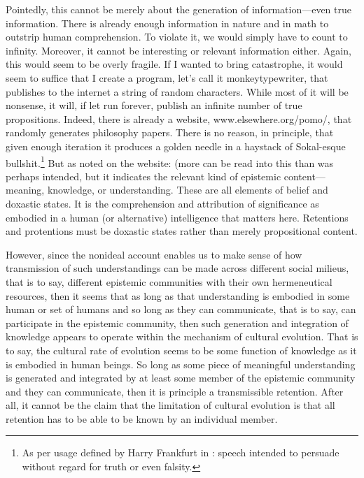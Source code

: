 \documentclass[letterpaper,notitlepage,12pt]{article}
\begin{document}
Pointedly, this cannot be merely about the generation of information---even true
information.
There is already enough information in nature and in math to outstrip human
comprehension.
To violate it, we would simply have to count to infinity.
Moreover, it cannot be interesting or relevant information either.
Again, this would seem to be overly fragile.
If I wanted to bring catastrophe, it would seem to suffice that I create a
program, let's call it monkeytypewriter, that publishes to the internet a string
of random characters.
While most of it will be nonsense, it will, if let run forever, publish an
infinite number of true propositions.
Indeed, there is already a website, www.elsewhere.org/pomo/, that randomly
generates philosophy papers.
There is no reason, in principle, that given enough iteration it produces a
golden needle in a haystack of Sokal-esque bullshit.\footnote{As per usage
defined by Harry Frankfurt in : speech intended to
persuade without regard for truth or even falsity.}
But as noted on the website: 
(more can be read into this than was perhaps intended, but it indicates the
relevant kind of epistemic content---meaning, knowledge, or understanding.
These are all elements of belief and doxastic states.
It is the comprehension and attribution of significance as embodied in a human
(or alternative) intelligence that matters here.
Retentions and protentions must be doxastic states rather than merely
propositional content.

However, since the nonideal account enables us to make sense of how transmission
of such understandings can be made across different social milieus, that is to
say, different epistemic communities with their own hermeneutical resources,
then it seems that as long as that understanding is embodied in some human or
set of humans and so long as they can communicate, that is to say, can
participate in the epistemic community, then such generation and integration of
knowledge appears to operate within the mechanism of cultural evolution.
That is to say, the cultural rate of evolution seems to be some function of
knowledge as it is embodied in human beings.
So long as some piece of meaningful understanding is generated and integrated by
at least some member of the epistemic community and they can communicate, then
it is principle a transmissible retention.
After all, it cannot be the claim that the limitation of cultural evolution is
that all retention has to be able to be known by an individual member.
\end{document}
